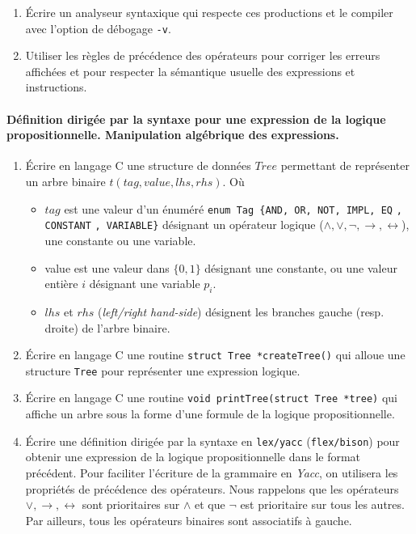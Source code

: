\documentclass[11pt]{article}
\newcommand{\Num}{4}
\newcounter{numexercice}
\newenvironment{exercice}{\addtocounter{numexercice}{1}
\noindent{\large \bf Exercice {\Num}.\thenumexercice }}{\bigskip}
\begin{document}
\begin{exercice}
\begin{enumerate}
\item Écrire un analyseur syntaxique qui respecte ces productions et
  le compiler avec l'option de débogage \verb#-v#.

\item Utiliser les règles de précédence des opérateurs pour corriger les
  erreurs affichées et pour respecter la sémantique usuelle des
  expressions et instructions.
\end{enumerate}


\end{exercice}

\begin{exercice}
\paragraph{Définition dirigée par la syntaxe pour une expression de
  la logique propositionnelle. Manipulation algébrique des expressions.}

\begin{enumerate}
\item Écrire en langage C une structure de données $Tree$ permettant de
  représenter un arbre binaire $t(tag, value, lhs, rhs)$. Où 

\begin{itemize}
 \item $tag$ est une valeur d'un énuméré
  \verb#enum Tag {AND, OR, NOT, IMPL, EQ# \verb#, CONSTANT# \verb#, VARIABLE}#
  désignant un opérateur logique
  ($\land, \lor, \lnot, \rightarrow, \leftrightarrow$), une constante
  ou une variable.
\item value est une valeur dans $\{0, 1\}$ désignant une constante, ou
  une valeur entière $i$ désignant une variable $p_i$.
\item $lhs$ et $rhs$ (\textit{left/right hand-side}) désignent les
  branches gauche (resp. droite) de l'arbre binaire.
\end{itemize}

\item Écrire en langage C une routine \verb$struct Tree *createTree()$ qui alloue une
  structure \verb$Tree$ pour représenter une
  expression logique.

\item Écrire en langage C une routine \verb$void printTree(struct Tree *tree)$ qui affiche un
  arbre sous la forme d'une formule de la logique propositionnelle.

\item Écrire une définition dirigée par la syntaxe en
  \texttt{lex/yacc} (\texttt{flex/bison}) pour obtenir une expression
  de la logique propositionnelle dans le format précédent. Pour
  faciliter l'écriture de la grammaire en \textit{Yacc}, on utilisera
  les propriétés de précédence des opérateurs. Nous rappelons que les
  opérateurs $\lor, \rightarrow, \leftrightarrow$ sont prioritaires
  sur $\land$ et que $\lnot$ est prioritaire sur tous les autres. Par
  ailleurs, tous les opérateurs binaires sont associatifs à gauche.


\end{enumerate}
\end{exercice}
\end{document}
